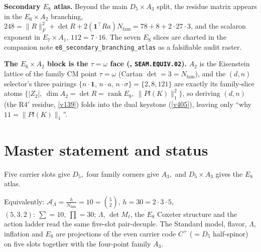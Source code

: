 \documentclass[11pt,a4paper]{article}
\newcommand{\Nfam}{N_{\mathrm{fam}}}
\newcommand{\AL}{\mathcal A_\Lambda}
\theoremstyle{definition}
\begin{document}
\noindent\textbf{Secondary $E_8$ atlas.} Beyond the main $D_5\times A_3$ split, the residue matrix appears
in the $E_6\times A_2$ branching, $248=\|R\|_F^2+\det R+2(\mathbf 1^\top Ra)\Nfam=78+8+2\cdot27\cdot3$, and
the scalaron exponent in $E_7\times A_1$, $112=7\cdot16$. The seven $E_8$ slices are charted in the
companion note \texttt{e8\_secondary\_branching\_atlas} as a falsifiable audit raster.
\par\smallskip\noindent\textbf{The $E_6{\times}A_2$ block is the $\tau{=}\omega$ face
(, \texttt{SEAM.EQUIV.02}).} $A_2$ is the Eisenstein lattice of the family
CM point $\tau{=}\omega$ (Cartan $\det=3=\Nfam$), and the $(d,n)$ selector's three pairings
$\{n{\cdot}\mathbf1,\,n{\cdot}a,\,n{\cdot}\sigma\}=\{2,8,121\}$ are exactly its family-slice atoms
$\{|Z_2|,\ \dim A_2{=}\det R{=}\operatorname{rank}E_8,\ \|Pl(K)\|_1^2\}$, so deriving $(d,n)$ (the R4$'$
residue, \vref{v139}) folds into the dual keystone (\vref{v405}), leaving only ``why $11{=}\|Pl(K)\|_1$''.

\section*{Master statement and status}
\begin{keyeq}
Five carrier slots give $D_5$,\ four family corners give $A_3$,\ and $D_5\times A_3$ gives the $E_8$ atlas.
\end{keyeq}
\noindent Equivalently: $\AL=\tfrac{h}{\Nfam}=10=\binom52$, $h=30=2\cdot3\cdot5$, $(5,3,2):\ \sum=10,\ \prod=30$;
$\Lambda$, $\det M_\ell$, the $E_8$ Coxeter structure and the action ladder read the same five-slot
pair-decuple. The Standard model, flavor, $\Lambda$, inflation and $E_8$ are projections of the
even carrier code $C^+$ ($=D_5$ half-spinor) on five slots together with the four-point family $A_3$.
\end{document}
